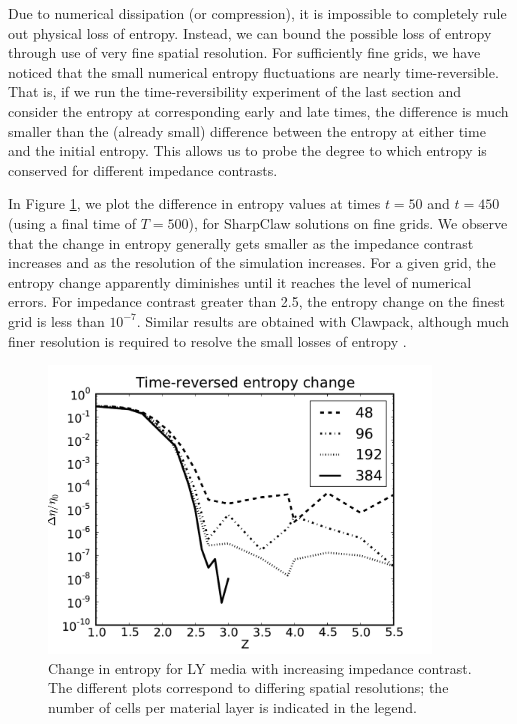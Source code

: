 Due to numerical dissipation (or compression), it is impossible 
to completely rule out physical loss of entropy.  Instead, we can bound the 
possible loss of entropy through use of very fine spatial resolution.
For sufficiently fine grids, we have noticed that the small
numerical entropy fluctuations are nearly time-reversible.  That is,
if we run the time-reversibility experiment of the last section and
consider the entropy at corresponding early and late times, the 
difference is much smaller than the (already small) difference between
the entropy at either time and the initial entropy.  This allows us
to probe the degree to which entropy is
conserved for different impedance contrasts.  

In Figure \ref{fig:trent}, we plot the difference in entropy 
values at times $t=50$ and $t=450$ (using a final time of $T=500$), for 
SharpClaw solutions on fine grids.
We observe that the change in entropy generally 
gets smaller as the impedance contrast increases and as the resolution
of the simulation increases.  For a given grid, 
the entropy change apparently diminishes until it reaches the level of numerical
errors.  For impedance contrast greater than
2.5, the entropy change on the finest grid is less than $10^{-7}$.
Similar results are obtained with Clawpack, although much finer
resolution is required to resolve the small losses of entropy \cite{alghamdipetclaw}.

\begin{figure}
\centerline{
\includegraphics[width=4in]{figures/trent_all.pdf}}
\caption{Change in entropy for LY media with increasing impedance contrast.
The different plots correspond to differing spatial resolutions; the
number of cells per material layer is indicated in the legend.\label{fig:trent}}
\end{figure}


